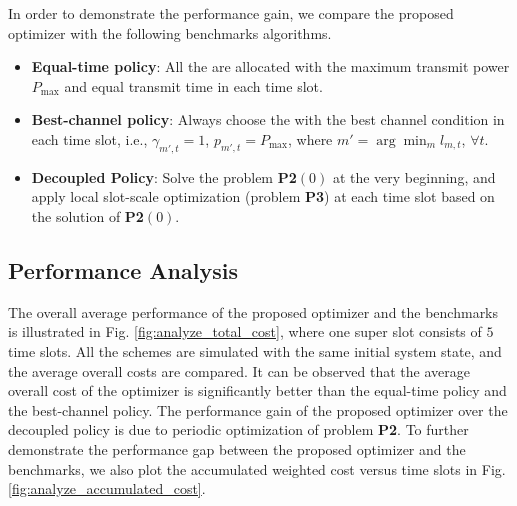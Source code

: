 In order to demonstrate the performance gain, we compare the proposed {\fwName} optimizer with the following benchmarks algorithms.
\begin{itemize}
    \item \textbf{Equal-time policy}: All the {\IAVs} are allocated with the maximum transmit power $P_{\max}$ and equal transmit time in each time slot.
    \item \textbf{Best-channel policy}: Always choose the {\IAV} with the best channel condition in each time slot, i.e., $\gamma_{m',t}=1$, $p_{m',t} = P_{\max}$, where $m' = \arg\min_{m} l_{m,t}$, $\forall t$.
    \item \textbf{Decoupled Policy}: Solve the problem \textbf{P2$(0)$} at the very beginning, and apply local slot-scale optimization (problem \textbf{P3}) at each time slot based on the solution of \textbf{P2$(0)$}.
\end{itemize}


\subsection{Performance Analysis}
\label{subsec:performance}

The overall average performance of the proposed {\fwName} optimizer and the benchmarks is illustrated in Fig. \ref{fig:analyze_total_cost}, where one super slot consists of $5$ time slots.
All the schemes are simulated with the same initial system state, and the average overall costs are compared. It can be observed that the average overall cost of the {\fwName} optimizer is significantly better than the equal-time policy and the best-channel policy. The performance gain of the proposed {\fwName} optimizer over the decoupled policy is due to periodic optimization of problem \textbf{P2}. To further demonstrate the performance gap between the proposed {\fwName} optimizer and the benchmarks, we also plot the accumulated weighted cost versus time slots in Fig. \ref{fig:analyze_accumulated_cost}.

